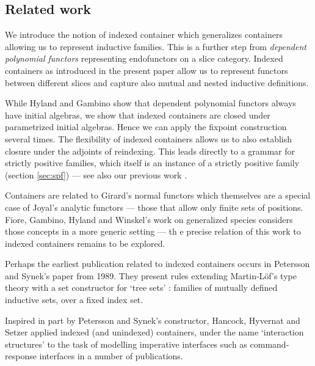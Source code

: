 \documentclass[a4paper]{article}
\begin{document}
\subsection{Related work}
\label{sec:related-work}

\noindent We introduce the notion of indexed container which
generalizes containers allowing us to represent inductive
families. This is a further step from \emph{dependent polynomial
  functors} \cite{HylandGambino} representing endofunctors on a slice
category. Indexed containers as introduced in the present paper allow us
to represent functors between different slices and capture also mutual
and nested inductive definitions.

While Hyland and Gambino \cite{HylandGambino} show that dependent polynomial 
functors always
have initial algebras, we show that indexed containers are closed under 
parametrized initial algebras. Hence we can apply the fixpoint
construction several times. The flexibility of indexed
containers allows us to also establish closure under the adjoints of
reindexing. This leads directly to a grammar for strictly positive
families, which itself is an instance of a strictly positive family 
(section \ref{sec:spf}) --- see also our previous work \cite{alti:cats07,alti:jcats07}.

Containers are related to Girard's normal functors \cite{GirardNormal} which
themselves are a special case of Joyal's analytic functors
\cite{JoyalA:fonaes} --- those that allow only finite sets of positions.
Fiore, Gambino, Hyland and Winskel's work on generalized species
\cite{fiore2008ccb} considers those concepts in a more generic setting ---
th e precise relation of this work to indexed containers remains to be
explored.

Perhaps the earliest publication related to indexed containers
occurs in Petersson and Synek's paper
\cite{PS89} from 1989. They present rules extending Martin-L{\"o}f's
type theory with a set constructor for `tree sets' : families of
mutually defined inductive sets, over a fixed index set.

Inspired in part by Petersson and Synek's constructor,
Hancock, Hyvernat and Setzer \cite{hancock-apal06} applied indexed (and unindexed)
containers, under the name `interaction structures' to the task of
modelling imperative interfaces such as command-response interfaces in
a number of publications. 
\end{document}
